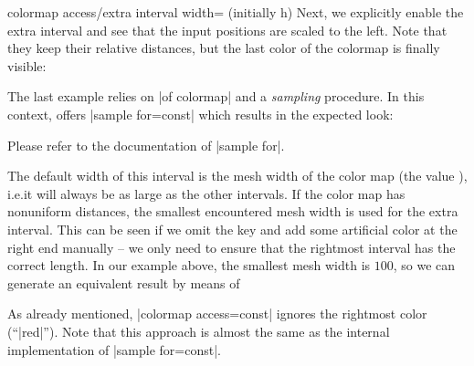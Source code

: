 {\begin{pgfplotskey}{colormap access/extra interval width= (initially h)}
    Next, we explicitly enable the extra interval and see that the input
    positions are scaled to the left. Note that they keep their relative
    distances, but the last color of the colormap is finally visible:
\begin{codeexample}[]
\pgfplotscolorbardrawstandalone[
    colormap={nonuniform}{
        of colormap={
            viridis,
            target pos={0,200,300,500,700,1000}
        },
    },
    colorbar horizontal,
    colormap access=const,
    colormap access/extra interval width=h,
    colorbar style={xtick=data,font=\tiny,
        /pgf/number format/precision=0},
    colormap access=const,
]
\end{codeexample}

    The last example relies on |of colormap| and a \emph{sampling} procedure.
    In this context, \PGFPlots{} offers |sample for=const| which results in the
    expected look:
\begin{codeexample}[]
\pgfplotscolorbardrawstandalone[
    colormap={nonuniform}{
        of colormap={
            viridis,
            target pos={0,200,300,500,700,1000},
            sample for=const,
        },
    },
    colorbar horizontal,
    colormap access=const,
    colorbar style={xtick=data,font=\tiny,
        /pgf/number format/precision=0},
    colormap access=const,
]
\end{codeexample}
    Please refer to the documentation of |sample for|.

    The default width of this interval is the mesh width of the color map (the
    value ), i.e.\@ it will always be as large as the other
    intervals. If the color map has nonuniform distances, the smallest
    encountered mesh width is used for the extra interval. This can be seen if
    we omit the key and add some artificial color at the right end manually --
    we only need to ensure that the rightmost interval has the correct length.
    In our example above, the smallest mesh width is $100$, so we can generate
    an equivalent result by means of
\begin{codeexample}[]
\pgfplotscolorbardrawstandalone[
    colormap={nonuniform}{
        of colormap={
            viridis,
            target pos={0,200,300,500,700,1000}
        },
        color(1100)=(red)
    },
    colorbar horizontal,
    colormap access=const,
    colorbar style={xtick=data,font=\tiny,
        /pgf/number format/precision=0},
    colormap access=const,
]
\end{codeexample}
    \noindent As already mentioned, |colormap access=const| ignores the
    rightmost color (``|red|''). Note that this approach is almost the same as
    the internal implementation of |sample for=const|.


\end{pgfplotskey}}

